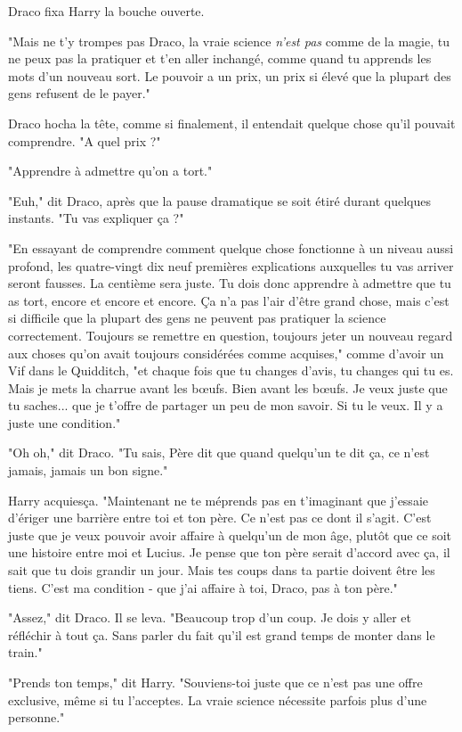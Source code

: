 Draco fixa Harry la bouche ouverte.

"Mais ne t'y trompes pas Draco, la vraie science \emph{n'est pas}  comme de la magie, tu ne peux pas la pratiquer et t'en aller inchangé, comme quand tu apprends les mots d'un nouveau sort. Le pouvoir a un prix, un prix si élevé que la plupart des gens refusent de le payer."

Draco hocha la tête, comme si finalement, il entendait quelque chose qu'il pouvait comprendre. "A quel prix ?"

"Apprendre à admettre qu'on a tort."

"Euh," dit Draco, après que la pause dramatique se soit étiré durant quelques instants. "Tu vas expliquer ça ?"

"En essayant de comprendre comment quelque chose fonctionne à un niveau aussi profond, les quatre-vingt dix neuf premières explications auxquelles tu vas arriver seront fausses. La centième sera juste. Tu dois donc apprendre à admettre que tu as tort, encore et encore et encore. Ça n'a pas l'air d'être grand chose, mais c'est si difficile que la plupart des gens ne peuvent pas pratiquer la science correctement. Toujours se remettre en question, toujours jeter un nouveau regard aux choses qu'on avait toujours considérées comme acquises," comme d'avoir un Vif dans le Quidditch, "et chaque fois que tu changes d'avis, tu changes qui tu es. Mais je mets la charrue avant les bœufs. Bien avant les bœufs. Je veux juste que tu saches... que je t'offre de partager un peu de mon savoir. Si tu le veux. Il y a juste une condition."

"Oh oh," dit Draco. "Tu sais, Père dit que quand quelqu'un te dit ça, ce n'est jamais, jamais un bon signe."

Harry acquiesça. "Maintenant ne te méprends pas en t'imaginant que j'essaie d'ériger une barrière entre toi et ton père. Ce n'est pas ce dont il s'agit. C'est juste que je veux pouvoir avoir affaire à quelqu'un de mon âge, plutôt que ce soit une histoire entre moi et Lucius. Je pense que ton père serait d'accord avec ça, il sait que tu dois grandir un jour. Mais tes coups dans ta partie doivent être les tiens. C'est ma condition - que j'ai affaire à toi, Draco, pas à ton père."

"Assez," dit Draco. Il se leva. "Beaucoup trop d'un coup. Je dois y aller et réfléchir à tout ça. Sans parler du fait qu'il est grand temps de monter dans le train."

"Prends ton temps," dit Harry. "Souviens-toi juste que ce n'est pas une offre exclusive, même si tu l'acceptes. La vraie science nécessite parfois plus d'une personne."

